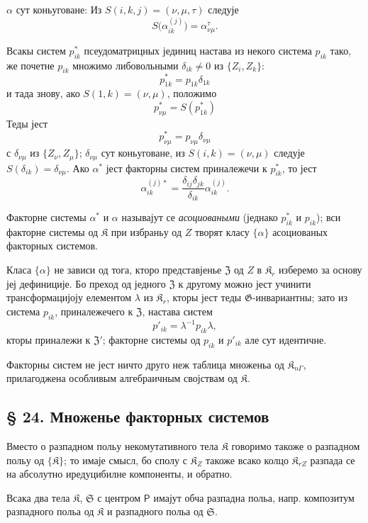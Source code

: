 \documentclass[11pt]{article}
\begin{document}
\(\alpha\) сут коньуговане: Из \(S(i,k,j)=(\nu,\mu,\tau)\) следује
\[
S\bigl(\alpha_{ik}^{(j)}\bigr)=\alpha_{\nu\mu}^{\tau}.
\]

Всакы систем \(p_{ik}^*\) псеудоматрицных јединиц настава из некого система \(p_{ik}\) тако, же почетне \(p_{ik}\) множимо либовольными \(\delta_{ik}\ne0\) из \(\{Z_i,Z_k\}\):
\[
p_{1k}^*=p_{1k}\delta_{1k}
\]
и тада знову, ако \(S(1,k)=(\nu,\mu)\), положимо
\[
p_{\nu\mu}^*=S(p_{1k}^*)
\]
Теды јест
\[
p_{\nu\mu}^*=p_{\nu\mu}\delta_{\nu\mu}
\]
с \(\delta_{\nu\mu}\) из \(\{Z_\nu,Z_\mu\}\); \(\delta_{\nu\mu}\) сут коньуговане, из \(S(i,k)=(\nu,\mu)\) следује \(S(\delta_{ik})=\delta_{\nu\mu}\). Ако \(\alpha^*\) јест факторны систем приналежечи к \(p_{ik}^*\), то јест
\[
\alpha_{ik}^{(j)*}=\frac{\delta_{ij}\delta_{jk}}{\delta_{ik}}\alpha_{ik}^{(j)}.
\]

Факторне системы \(\alpha^*\) и \(\alpha\) называјут се \emph{асоциоваными} (једнако \(p_{ik}^*\) и \(p_{ik}\)); вси факторне системы од \(\mathfrak K\) при избраньу од \(Z\) творят класу \(\{\alpha\}\) асоциованых факторных системов.

Класа \(\{\alpha\}\) не зависи од тога, кторо представјенье \(\mathfrak Z\) од \(Z\) в \(\mathfrak K_r\) изберемо за основу јеј дефиниције. Бо преход од једного \(\mathfrak Z\) к другому можно јест учинити трансформацијоју елементом \(\lambda\) из \(\mathfrak K_r\), кторы јест теды \(\mathfrak G\)-инвариантны; зато из система \(p_{ik}\), приналежечего к \(\mathfrak Z\), настава систем
\[
p'_{ik}=\lambda^{-1}p_{ik}\lambda,
\]
кторы приналежи к \(\mathfrak Z'\); факторне системы од \(p_{ik}\) и \(p'_{ik}\) але сут идентичне.

Факторны систем не јест ничто друго неж таблица множеньа од \(\mathfrak K_{n\Gamma}\), прилагоджена особливым алгебраичным својствам од \(\mathfrak K\).

\subsection*{§ 24. Множенье факторных системов}\label{multiplikation-von-faktorensystemen}

Вместо о разпадном польу некомутативного тела \(\mathfrak K\) говоримо такоже о разпадном польу од \(\{\mathfrak K\}\); то имаје смысл, бо сполу с \(\mathfrak K_Z\) такоже всако колцо \(\mathfrak K_{rZ}\) разпада се на абсолутно иредуцибилне компоненты, и обратно.

Всака два тела \(\mathfrak K\), \(\mathfrak S\) с центром \(\mathsf P\) имајут обча разпадна польа, напр. композитум разпадного польа од \(\mathfrak K\) и разпадного польа од \(\mathfrak S\).
\end{document}

